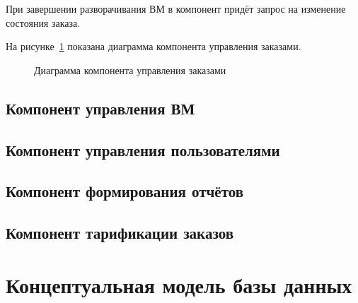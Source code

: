 При завершении разворачивания ВМ в компонент придёт запрос на изменение состояния заказа.

На рисунке~\ref{fig:order_control_scheme} показана диаграмма компонента управления заказами.
\begin{figure}[ht]
  \caption{Диаграмма компонента управления заказами}\label{fig:order_control_scheme}
\end{figure}

\subsection{Компонент управления ВМ}\label{sec:subs2}
\subsection{Компонент управления пользователями}\label{sec:subs3}
\subsection{Компонент формирования отчётов}\label{sec:subs4}
\subsection{Компонент тарификации заказов}\label{sec:subs5}


\section{Концептуальная модель базы данных}\label{sec:ch4/sect3}




